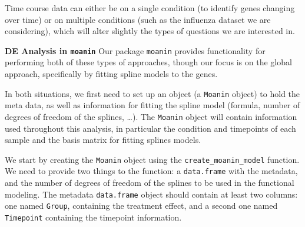 \documentclass[9pt,a4paper,]{extarticle}
\begin{document}
Time course data can either be on a single condition (to identify genes
changing over time) or on multiple conditions (such as the influenza
dataset we are considering), which will alter slightly the types of questions
we are interested in.

\textbf{DE Analysis in \texttt{moanin}} Our package \texttt{moanin} provides functionality for performing both of
these types of approaches, though our focus is on the global approach, specifically by fitting spline models to the genes.

In both situations, we first need to set up an object (a \texttt{Moanin} object) to
hold the meta data, as well as information for fitting the spline model
(formula, number of degrees of freedom of the splines, \ldots{}). The \texttt{Moanin}
object will contain information used throughout this analysis, in particular
the condition and timepoints of each sample and the basis matrix for
fitting splines models.

We start by creating the \texttt{Moanin} object using the \texttt{create\_moanin\_model}
function. We need to provide two things to the function: a \texttt{data.frame} with
the metadata, and the number of degrees of freedom of the splines to be used in the
functional modeling. The metadata \texttt{data.frame} object should contain at least
two columns: one named \texttt{Group}, containing the treatment effect, and a
second one named \texttt{Timepoint} containing the timepoint information.
\end{document}
